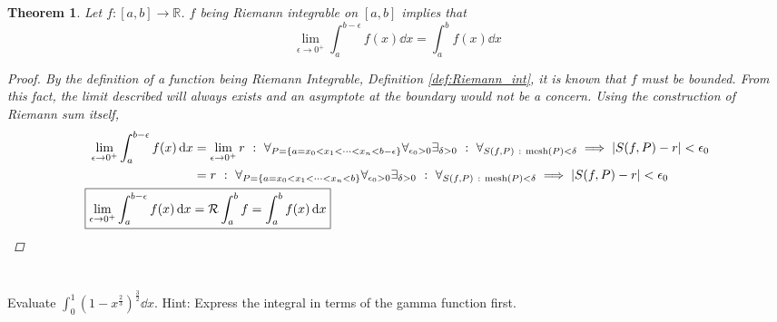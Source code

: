 \documentclass[]{article}
\newcommand{\R}{\mathbb{R}}
\newcommand{\st}{\ : \ }
\newtheorem{theorem}{Theorem}
\begin{document}
\begin{theorem}
    Let $f : [a,b] \to \R$.
    $f$ being Riemann integrable on $[a,b]$ implies that \[
        \lim_{\epsilon\to 0^{+}} \int_{a}^{b - \epsilon} f(x) \dd{x} = \int_{a}^{b} f(x) \dd{x}
    \]
    \begin{proof}
        By the definition of a function being Riemann Integrable, Definition \ref{def:Riemann_int}, it is known that $f$ must be bounded.
        From this fact, the limit described will always exists and an asymptote at the boundary would not be a concern.
        Using the construction of Riemann sum itself, 
        \begin{align*}
            \lim_{\epsilon\to 0^{+}} \int_{a}^{b - \epsilon} f(x) \dd{x} 
                &= \lim_{\epsilon \to 0^{+}} r \st \forall_{P = \qty{a = x_0 < x_1 < \cdots < x_n < b - \epsilon}}
                \forall_{\epsilon_0>0} \exists_{\delta>0} 
                \st \forall_{S(f,P) \st \text{mesh}(P) < \delta} \implies \abs{S(f,P) - r} < \epsilon_0\\
                &= r \st \forall_{P = \qty{a = x_0 < x_1 < \cdots < x_n < b}} \forall_{\epsilon_0>0} \exists_{\delta>0} 
                \st \forall_{S(f,P) \st \text{mesh}(P) < \delta} \implies \abs{S(f,P) - r} < \epsilon_0\\
            \Aboxed{
                \lim_{\epsilon\to 0^{+}} \int_{a}^{b - \epsilon} f(x) \dd{x} 
                    &= \mathcal{R} \int_a^b f = \int_{a}^{b} f(x) \dd{x}
            }
        \end{align*}
    \end{proof}
\end{theorem}

\newpage
\section{}
Evaluate $\int_{0}^{1} (1-x^{\frac{2}{3}})^{\frac{3}{2}} \dd{x}$.
Hint: Express the integral in terms of the gamma function first.
\end{document}
